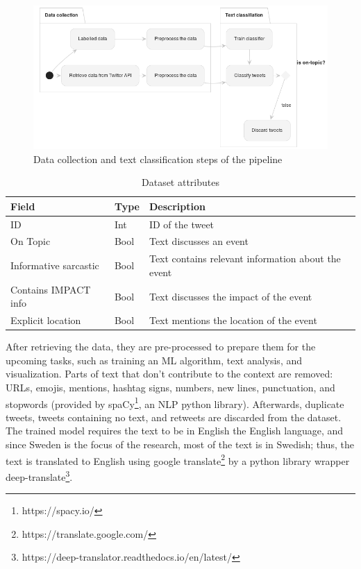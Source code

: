 \begin{figure}[H]
\begin{center}
  \includegraphics[width=\columnwidth]{./images/data_collection_text_classification.png}
\end{center}
\caption{Data collection and text classification steps of the pipeline}
\label{fig:flow_chart_data_collection_text_classification}
\end{figure}


\begin{table}
  \center
  \label{tab:dataset_attr}
  \begin{tabular}{|l|l|l|}
    \hline
    Field & Type & Description \\
    \hline
    ID & Int & ID of the tweet\\
    \hline
    On Topic  & Bool & Text discusses an event \\
    \hline
    Informative sarcastic  & Bool & Text contains relevant information about the event \\
    \hline
    Contains IMPACT info & Bool & Text discusses the impact of the event \\
    \hline
    Explicit location & Bool & Text mentions the location of the event \\
    \hline
  \end{tabular}
  \caption{Dataset attributes}
\end{table}

After retrieving the data, they are pre-processed to prepare them for the upcoming tasks, such as training an
\ac{ML} algorithm, text analysis, and visualization.  Parts of text that don't contribute to the
context are removed: \ac{URL}s, emojis, mentions, hashtag signs, numbers, new lines, punctuation,
and stopwords (provided by spaCy\footnote{https://spacy.io/}, an \ac{NLP} python library).
Afterwards, duplicate tweets, tweets containing no text, and retweets are discarded from the
dataset. The trained model requires the text to be in English the English language, and since Sweden
is the focus of the research, most of the text is in Swedish; thus, the text is translated to
English using google translate\footnote{https://translate.google.com/} by a python library wrapper
deep-translate\footnote{https://deep-translator.readthedocs.io/en/latest/}. 

